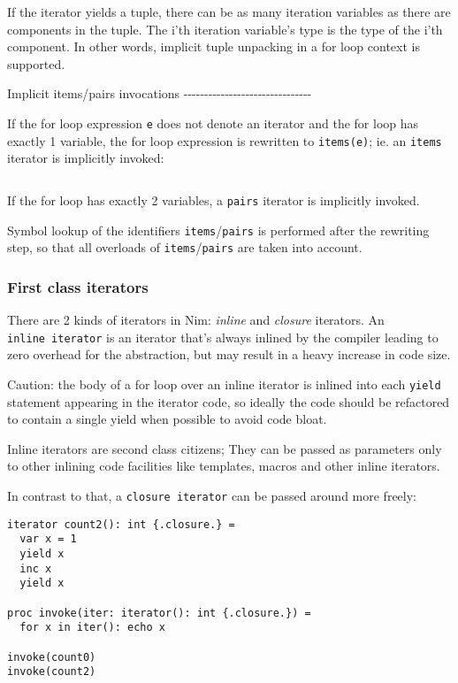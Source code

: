If the iterator yields a tuple, there can be as many iteration variables
as there are components in the tuple. The i'th iteration variable's type
is the type of the i'th component. In other words, implicit tuple
unpacking in a for loop context is supported.

Implicit items/pairs invocations
-\/-\/-\/-\/-\/-\/-\/-\/-\/-\/-\/-\/-\/-\/-\/-\/-\/-\/-\/-\/-\/-\/-\/-\/-\/-\/-\/-\/-\/-\/-

If the for loop expression \texttt{e} does not denote an iterator and
the for loop has exactly 1 variable, the for loop expression is
rewritten to \texttt{items(e)}; ie. an \texttt{items} iterator is
implicitly invoked:

\begin{verbatim}
\end{verbatim}

If the for loop has exactly 2 variables, a \texttt{pairs} iterator is
implicitly invoked.

Symbol lookup of the identifiers \texttt{items}/\texttt{pairs} is
performed after the rewriting step, so that all overloads of
\texttt{items}/\texttt{pairs} are taken into account.

\hypertarget{first-class-iterators}{%
\subsubsection{First class iterators}\label{first-class-iterators}}

There are 2 kinds of iterators in Nim: \emph{inline} and \emph{closure}
iterators. An \texttt{inline\ iterator} is an iterator that's always
inlined by the compiler leading to zero overhead for the abstraction,
but may result in a heavy increase in code size.

Caution: the body of a for loop over an inline iterator is inlined into
each \texttt{yield} statement appearing in the iterator code, so ideally
the code should be refactored to contain a single yield when possible to
avoid code bloat.

Inline iterators are second class citizens; They can be passed as
parameters only to other inlining code facilities like templates, macros
and other inline iterators.

In contrast to that, a \texttt{closure\ iterator} can be passed around
more freely:

\begin{verbatim}
iterator count2(): int {.closure.} =
  var x = 1
  yield x
  inc x
  yield x

proc invoke(iter: iterator(): int {.closure.}) =
  for x in iter(): echo x

invoke(count0)
invoke(count2)
\end{verbatim}

